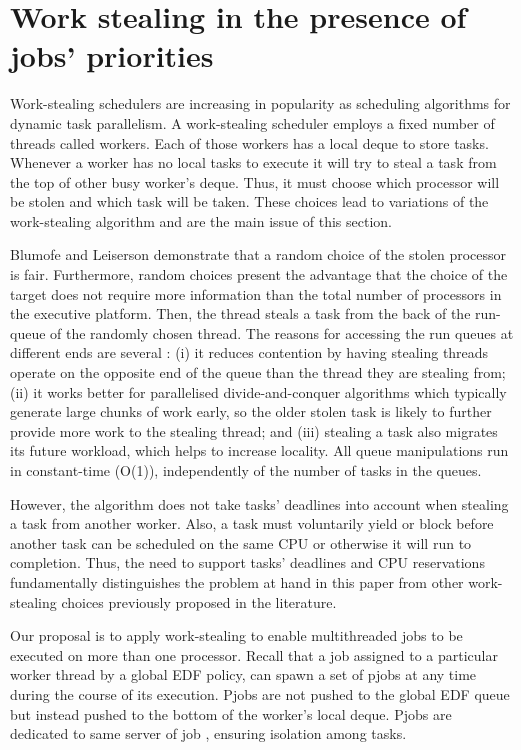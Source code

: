\documentclass[10pt,twocolumn]{article}
\begin{document}
\section{Work stealing in the presence of jobs' priorities}

Work-stealing schedulers are increasing in popularity as scheduling algorithms for dynamic task parallelism. A work-stealing scheduler employs a fixed number of threads called workers. Each of those workers has a local deque to store tasks. Whenever a worker has no local tasks to execute it will try to steal a task from the top of other busy worker's deque. Thus, it must choose which processor will be stolen and which task will be taken. These choices lead to variations of the work-stealing algorithm and are the main issue of this section.

Blumofe and Leiserson \cite{blumofe99} demonstrate that a random choice of the stolen processor is fair. Furthermore, random choices present the advantage that the choice of the target does not require more information than the total number of processors in the executive platform. Then, the thread steals a task from the back of the run-queue of the randomly chosen thread. The reasons for accessing the run queues at different ends are several \cite{frigo98}: (i) it reduces contention by having stealing threads operate on the opposite end of the queue than the thread they are stealing from; (ii) it works better for parallelised divide-and-conquer algorithms which typically generate large chunks of work early, so the older stolen task is likely to further provide more work to the stealing thread; and (iii) stealing a task also migrates its future workload, which helps to increase locality. All queue manipulations run in constant-time (O(1)), independently of the number of tasks in the queues.



However, the algorithm does not take tasks' deadlines into account when stealing a task from another worker. Also, a task must voluntarily yield or block before another task can be scheduled on the same CPU or otherwise it will run to completion. Thus, the need to support tasks' deadlines and CPU reservations fundamentally distinguishes the problem at hand in this paper from other work-stealing choices previously proposed in the literature.

Our proposal is to apply work-stealing to enable multithreaded jobs to be executed on more than one processor. Recall that a job  assigned to a particular worker thread by a global EDF policy, can spawn a set of pjobs at any time during the course of its execution. Pjobs are not pushed to the global EDF queue but instead pushed to the bottom of the worker's local deque. Pjobs are dedicated to same server  of job , ensuring isolation among tasks. 
\end{document}
